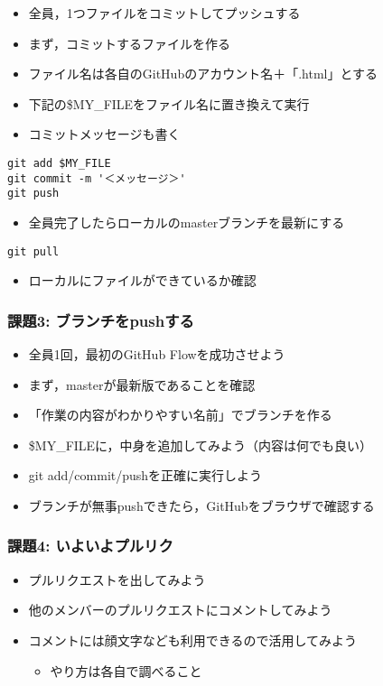 \documentclass[a4paper,twoside,twocolumn]{bxjsarticle}
\begin{document}
\begin{itemize}
\item 全員，1つファイルをコミットしてプッシュする
\item まず，コミットするファイルを作る
\item ファイル名は各自のGitHubのアカウント名＋「.html」とする
\item 下記の\$MY\_FILEをファイル名に置き換えて実行
\item コミットメッセージも書く
\end{itemize}

\begin{verbatim}
git add $MY_FILE
git commit -m '＜メッセージ＞'
git push
\end{verbatim}

\begin{itemize}
\item 全員完了したらローカルのmasterブランチを最新にする
\end{itemize}

\begin{verbatim}
git pull
\end{verbatim}

\begin{itemize}
\item ローカルにファイルができているか確認
\end{itemize}

\subsubsection{課題3: ブランチをpushする}
\label{sec-2-1-3}
\begin{itemize}
\item 全員1回，最初のGitHub Flowを成功させよう
\item まず，masterが最新版であることを確認
\item 「作業の内容がわかりやすい名前」でブランチを作る
\item \$MY\_FILEに，中身を追加してみよう（内容は何でも良い）
\item git add/commit/pushを正確に実行しよう
\item ブランチが無事pushできたら，GitHubをブラウザで確認する
\end{itemize}

\subsubsection{課題4: いよいよプルリク}
\label{sec-2-1-4}
\begin{itemize}
\item プルリクエストを出してみよう
\item 他のメンバーのプルリクエストにコメントしてみよう
\item コメントには顔文字なども利用できるので活用してみよう
\begin{itemize}
\item やり方は各自で調べること
\end{itemize}
\end{itemize}
\end{document}
